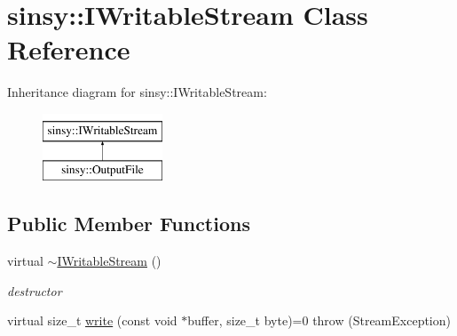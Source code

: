 \hypertarget{classsinsy_1_1IWritableStream}{\section{sinsy\-:\-:\-I\-Writable\-Stream \-Class \-Reference}
\label{classsinsy_1_1IWritableStream}
}
\-Inheritance diagram for sinsy\-:\-:\-I\-Writable\-Stream\-:\begin{figure}[H]
\begin{center}
\leavevmode
\includegraphics[height=2.000000cm]{classsinsy_1_1IWritableStream}
\end{center}
\end{figure}
\subsection*{\-Public \-Member \-Functions}
\begin{DoxyCompactItemize}
\item 
\hypertarget{classsinsy_1_1IWritableStream_a7daec491e272ee964d13a567e6adb2f3}{virtual \hyperlink{classsinsy_1_1IWritableStream_a7daec491e272ee964d13a567e6adb2f3}{$\sim$\-I\-Writable\-Stream} ()}\label{classsinsy_1_1IWritableStream_a7daec491e272ee964d13a567e6adb2f3}

\begin{DoxyCompactList}\small\item\em destructor \end{DoxyCompactList}\item 
virtual size\-\_\-t \hyperlink{classsinsy_1_1IWritableStream_a0e7f8f7e1c41c6edd1b0d540957ba1cc}{write} (const void $\ast$buffer, size\-\_\-t byte)=0  throw (\-Stream\-Exception)
\end{DoxyCompactItemize}


